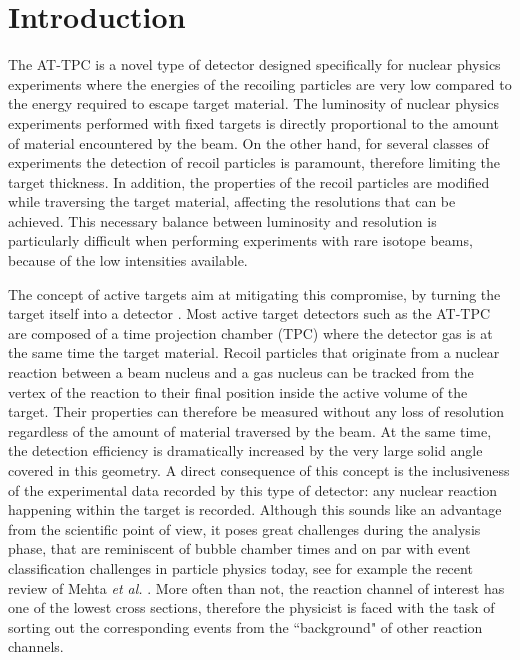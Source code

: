 \documentclass[review,number,sort&compress]{elsarticle}
\begin{document}
\section{Introduction}\label{sec:intro}



The AT-TPC \cite{Bradt2017} is a novel type of detector designed specifically for nuclear physics experiments where the energies of the recoiling particles are very low compared to the energy required to escape target material. The luminosity of nuclear physics experiments performed with fixed targets is directly proportional to the amount of material encountered by the beam. On the other hand, for several classes of experiments the detection of recoil particles is paramount, therefore limiting the target thickness. In addition, the properties of the recoil particles are modified while traversing the target material, affecting the resolutions that can be achieved. This necessary balance between luminosity and resolution is particularly difficult when performing experiments with rare isotope beams, because of the low intensities available. 

The concept of active targets aim at mitigating this compromise, by turning the target itself into a detector \cite{BECEIRONOVO2015}. Most active target detectors such as the AT-TPC are composed of a time projection chamber (TPC) where the detector gas is at the same time the target material. Recoil particles that originate from a nuclear reaction between a beam nucleus and a gas nucleus can be tracked from the vertex of the reaction to their final position inside the active volume of the target. Their properties can therefore be measured without any loss of resolution regardless of the amount of material traversed by the beam. At the same time, the detection efficiency is dramatically increased by the very large solid angle covered in this geometry. A direct consequence of this concept is the inclusiveness of the experimental data recorded by this type of detector: any nuclear reaction happening within the target is recorded. Although this sounds like an advantage from the scientific point of view, it poses great challenges during the analysis phase, that are reminiscent of bubble chamber times and on par with event classification challenges in particle physics today, see for example the recent review of Mehta {\em et al.} \cite{mehta2019}. More often than not, the reaction channel of interest has one of the lowest cross sections, therefore the physicist is faced with the task of sorting out the corresponding events from the ``background" of other reaction channels. 
\end{document}
